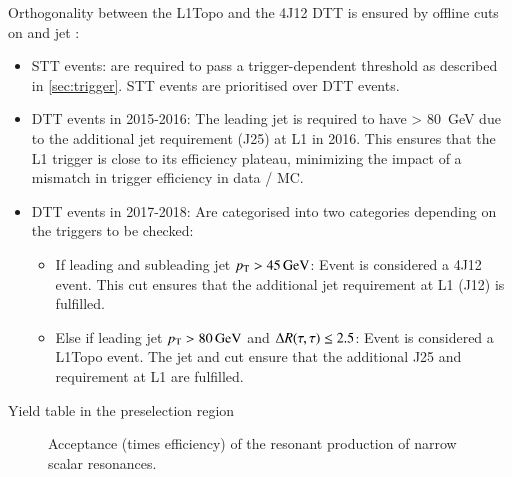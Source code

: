 Orthogonality between the L1Topo and the 4J12 DTT is ensured by offline cuts on
\tauhadvis and jet \pT:
\begin{itemize}
\item STT events: \tauhadvis are required to pass a trigger-dependent \pT
  threshold as described in \cref{sec:trigger}. STT events are prioritised over
  DTT events.

\item DTT events in 2015-2016: The leading jet is required to have \pT >
  \SI{80}{\GeV} due to the additional jet requirement (J25) at L1 in 2016. This
  ensures that the L1 trigger is close to its efficiency plateau, minimizing the
  impact of a mismatch in trigger efficiency in data / MC.

\item DTT events in 2017-2018: Are categorised into two categories depending on
  the triggers to be checked:
  \begin{itemize}
  \item If leading and subleading jet $p_{\text{T}} > \SI{45}{\ensuremath{\text{GeV}}}$: Event is considered a
    4J12 event. This cut ensures that the additional jet requirement at L1 (J12)
    is fulfilled.
  \item Else if leading jet $\pT > \SI{80}{\GeV}$ and $\Delta R(\tau, \tau) \leq 2.5$:
    Event is considered a L1Topo event. The jet \pT and \dRtautau cut ensure
    that the additional J25 and \dRtautau requirement at L1 are fulfilled.
  \end{itemize}
\end{itemize}


\begin{table}[htbp]
  \centering
  \caption{Yield table in the \hadhad preselection region}
  \label{tab:hadhad_presel_yields}
\end{table}

\begin{figure}[htbp]
  \centering


  \caption{Acceptance (times efficiency) of the resonant production of narrow scalar resonances.}
  \label{fig:signal_acceptance_resonant}
\end{figure}




